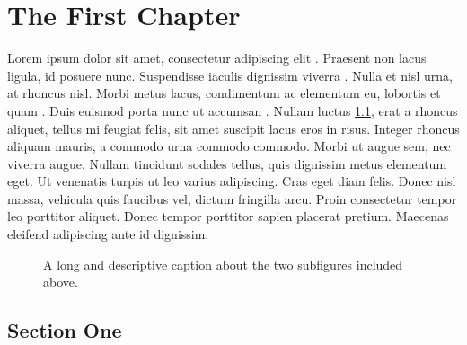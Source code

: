 \chapter{The First Chapter}

Lorem ipsum dolor sit amet, consectetur adipiscing elit \cite{Codishetal2000}. Praesent non lacus ligula, id posuere nunc. Suspendisse iaculis dignissim viverra \cite{Conway2000}. Nulla et nisl urna, at rhoncus nisl. Morbi metus lacus, condimentum ac elementum eu, lobortis et quam \cite{Meyer2000}. Duis euismod porta nunc ut accumsan \cite{Huetal2000}. Nullam luctus \ref{fig:figures1+2}, erat a rhoncus aliquet, tellus mi feugiat felis, sit amet suscipit lacus eros in risus. Integer rhoncus aliquam mauris, a commodo urna commodo commodo. Morbi ut augue sem, nec viverra augue. Nullam tincidunt sodales tellus, quis dignissim metus elementum eget. Ut venenatis turpis ut leo varius adipiscing. Cras eget diam felis. Donec nisl massa, vehicula quis faucibus vel, dictum fringilla arcu. Proin consectetur tempor leo porttitor aliquet. Donec tempor porttitor sapien placerat pretium. Maecenas eleifend adipiscing ante id dignissim.

\begin{figure}
\centering
{}
\caption[Short caption]{A long and descriptive caption about the two subfigures included above.}
\label{fig:figures1+2}
\end{figure}

\section{Section One}

